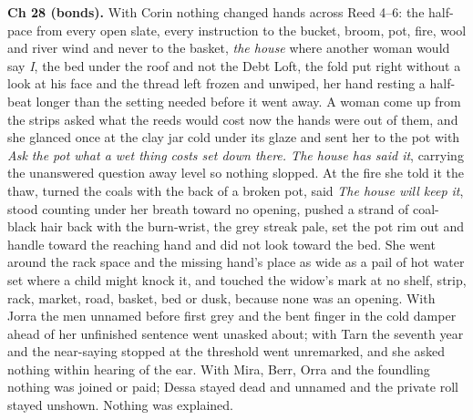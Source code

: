 \documentclass{design/chronicle}
\begin{document}
{\textbf{Ch 28 (bonds).} With Corin nothing changed hands across Reed 4–6: the half-pace from every open slate, every instruction to the bucket, broom, pot, fire, wool and river wind and never to the basket, \emph{the house} where another woman would say \emph{I}, the bed under the roof and not the Debt Loft, the fold put right without a look at his face and the thread left frozen and unwiped, her hand resting a half-beat longer than the setting needed before it went away. A woman come up from the strips asked what the reeds would cost now the hands were out of them, and she glanced once at the clay jar cold under its glaze and sent her to the pot with \emph{Ask the pot what a wet thing costs set down there. The house has said it}, carrying the unanswered question away level so nothing slopped. At the fire she told it the thaw, turned the coals with the back of a broken pot, said \emph{The house will keep it}, stood counting under her breath toward no opening, pushed a strand of coal-black hair back with the burn-wrist, the grey streak pale, set the pot rim out and handle toward the reaching hand and did not look toward the bed. She went around the rack space and the missing hand’s place as wide as a pail of hot water set where a child might knock it, and touched the widow’s mark at no shelf, strip, rack, market, road, basket, bed or dusk, because none was an opening. With Jorra the men unnamed before first grey and the bent finger in the cold damper ahead of her unfinished sentence went unasked about; with Tarn the seventh year and the near-saying stopped at the threshold went unremarked, and she asked nothing within hearing of the ear. With Mira, Berr, Orra and the foundling nothing was joined or paid; Dessa stayed dead and unnamed and the private roll stayed unshown. Nothing was explained.

}
\end{document}
